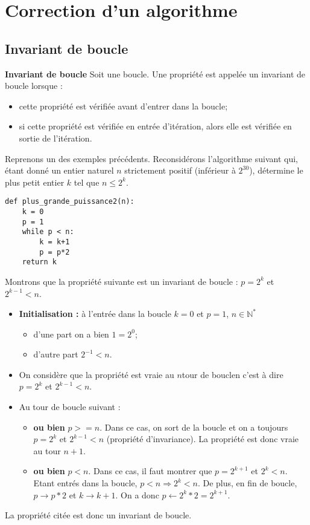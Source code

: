 \section{Correction d'un algorithme}
\subsection{Invariant de boucle}

\begin{defi}\textbf{Invariant de boucle}
Soit une boucle. Une propriété est appelée un invariant de boucle lorsque :
\begin{itemize}
\item cette propriété est vérifiée avant d'entrer dans la boucle;
\item si cette propriété est vérifiée en entrée d'itération, alors elle est vérifiée en sortie de l'itération.
\end{itemize}

\end{defi}


Reprenons un des exemples précédents. Reconsidérons l’algorithme suivant qui, étant donné un entier naturel $n$ strictement positif (inférieur à $2^{30}$), détermine le plus petit entier $k$ tel que $n \leq 2^k$.
\begin{lstlisting}
def plus_grande_puissance2(n):
    k = 0
    p = 1
    while p < n:
        k = k+1
        p = p*2
    return k
\end{lstlisting}
\begin{demo}
Montrons que la propriété suivante est un invariant de boucle : $p=2^k$ et $2^{k-1}<n$.
\begin{itemize}
\item \textbf{Initialisation : }à l'entrée dans la boucle $k=0$ et $p=1$, $n\in\mathbb{N}^*$
\begin{itemize}
\item d'une part  on a bien $1=2^0$;
\item d'autre part $2^{-1}<n$.
\end{itemize}
\item On considère que la propriété est vraie au $n$\ieme tour de bouclen c'est à dire $p=2^k$ et $2^{k-1}<n$.
\item Au tour de boucle suivant : 
\begin{itemize}
\item \textbf{ou bien} $p>=n$. Dans ce cas, on sort de la boucle et on a toujours $p=2^k$ et $2^{k-1}<n$ (propriété d'invariance). La propriété est donc vraie au tour $n+1$.
\item \textbf{ou bien} $p<n$. Dans ce cas, il faut montrer que  $p=2^{k+1}$ et $2^{k}<n$. Etant entrés dans la boucle, $p<n \Rightarrow 2^k<n$. De plus, en fin de boucle, $p\rightarrow p *2$ et $k\rightarrow k+1$. On a donc $p\leftarrow 2^k *2=2^{k+1}$. 
\end{itemize}
\end{itemize}
La propriété citée est donc un invariant de boucle. 
\end{demo}

